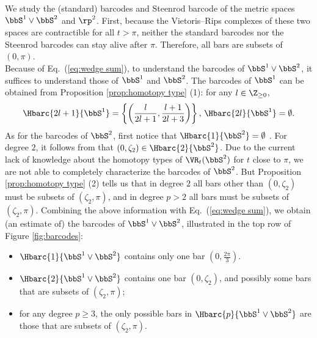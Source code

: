 \begin{example}
We study the (standard) barcodes and Steenrod barcode of the metric spaces $\bbS^1\vee\bbS^2$ and $\rp^2$. First, because the Vietoris--Rips complexes of these two spaces are contractible for all $t>\pi$, neither the standard barcodes nor the Steenrod barcodes can stay alive after $\pi$. Therefore, all bars are subsets of $(0,\pi)$. \\

Because of Eq.~(\ref{eq:wedge sum}), to understand the barcodes of $\bbS^1\vee\bbS^2$, it suffices to understand those of $\bbS^1$ and $\bbS^2$. The barcodes of $\bbS^1$ can be obtained from Proposition \ref{prop:homotopy type} (1): for any $l\in \Z_{\geq 0}$,
\[\Hbarc{2l+1}{\bbS^1}=\left\{\left(\frac{l}{2l+1},\frac{l+1}{2l+3}\right)\right\},\, \Hbarc{2l}{\bbS^1}=\emptyset.\]
As for the barcodes of $\bbS^2$, first notice that $\Hbarc{1}{\bbS^2}=\emptyset$ .  For degree $2$, it follows from \cite[Proposition 9.4]{lim2020vietoris} that $(0,\zeta_2)\in \Hbarc{2}{\bbS^2}$. Due to the current lack of knowledge about the homotopy types of $\VR_t(\bbS^2)$ for $ t$ close to $\pi$, we are not able to completely characterize the barcodes of $\bbS^2$. But Proposition \ref{prop:homotopy type} (2) tells us that in degree $2$ all bars other than $(0,\zeta_2)$ must be subsets  of $(\zeta_2,\pi)$, and in degree $p>2$ all bars must be subsets of $(\zeta_2,\pi)$. Combining the above information with Eq.~(\ref{eq:wedge sum}), we obtain (an estimate of) the barcodes of $\bbS^1\vee\bbS^2$, illustrated in the top row of Figure \ref{fig:barcodes}:
\begin{itemize}
    \item $\Hbarc{1}{\bbS^1\vee \bbS^2}$ contains only one bar $(0,\frac{2\pi}{3})$. 
    \item $\Hbarc{2}{\bbS^1\vee \bbS^2}$ contains one bar $(0,\zeta_2)$, and possibly some bars that are subsets of $(\zeta_2,\pi)$;
    \item for any degree $p\geq 3$, the only possible bars in $\Hbarc{p}{\bbS^1\vee \bbS^2}$ are those that are subsets of $(\zeta_2,\pi)$.
\end{itemize}


\end{example}
